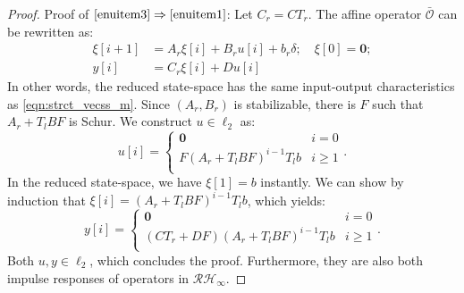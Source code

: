 \begin{proof}
Proof of \(\ref{enuitem3} \Rightarrow\ref{enuitem1}\):
Let \(C_r = C T_r\). The affine operator \(\bar{\mathcal{O}}\) can be rewritten as:
\begin{equation}
\begin{split}
    \xi[i+1] & =A_r \xi[i] + B_r u[i] + b_r \delta;\quad \xi[0] =\mathbf{0};\\
    y[i] &= C_r \xi[i] +D u[i]
\end{split}
\end{equation}
In other words, the reduced state-space has the same input-output characteristics as \eqref{eqn:strct_vecss_m}.  
Since \((A_r,B_r)\) is stabilizable, there is \(F\) such that \(A_r+T_l B F\) is Schur. We construct \(u \in \ell_2\) as:
\[
u[i] = \begin{cases}
    \mathbf{0} & i = 0\\
    F (A_r + T_l B F)^{i - 1} T_l b & i \geq 1\\
\end{cases}.
\]
In the reduced state-space, we have \(\xi[1] = b\) instantly.
We can show by induction that \(\xi[i] = (A_r + T_l B F)^{i - 1} T_l b\), which yields:
\[
y[i] = \begin{cases}
    \mathbf{0} & i = 0\\
    (C T_r +D F) (A_r + T_l B F)^{i - 1} T_l b & i \geq 1\\
\end{cases}.
\]
Both \(u,y \in \ell_2\), which concludes the proof. Furthermore, they are also both impulse responses of operators in \(\mathcal{RH}_\infty\).
\end{proof}

